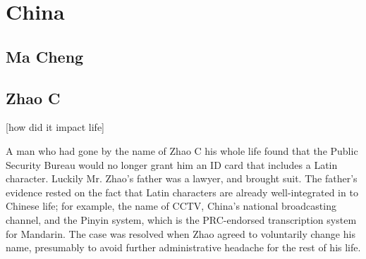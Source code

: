 \section{China}

\subsection{Ma Cheng}

\subsection{Zhao C}

[how did it impact life]

A man who had gone by the name of Zhao C his whole life found that the Public
Security Bureau would no longer grant him an ID card that includes a Latin
character. Luckily Mr. Zhao's father was a lawyer, and brought suit. The
father's evidence rested on the fact that Latin characters are already
well-integrated in to Chinese life; for example, the name of CCTV, China's
national broadcasting channel, and the Pinyin system, which is the PRC-endorsed
transcription system for Mandarin. The case was resolved when Zhao agreed to
voluntarily change his name, presumably to avoid further administrative headache
for the rest of his life.


